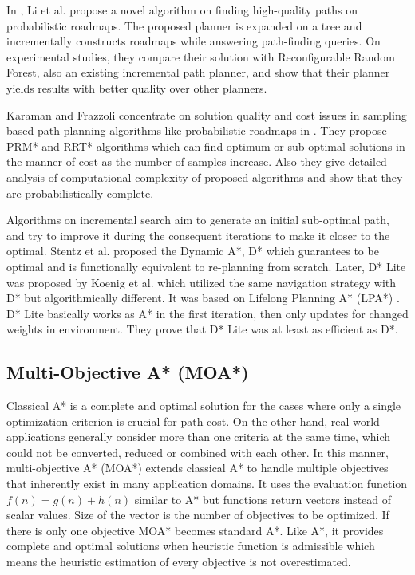 \documentclass[10pt,journal]{IEEEtran}
\begin{document}
In \cite{Li_KOrder:2014}, Li et al. propose a novel algorithm on finding high-quality paths on probabilistic roadmaps. The proposed planner is expanded on a tree and incrementally constructs roadmaps while answering path-finding queries. On experimental studies, they compare their solution with Reconfigurable Random Forest, also an existing incremental path planner, and show that their planner yields results with better quality over other planners.

Karaman and Frazzoli concentrate on solution quality and cost issues in sampling based path planning algorithms like probabilistic roadmaps in \cite{Karaman:2011}. They propose PRM* and RRT* algorithms which can find optimum or sub-optimal solutions in the manner of cost as the number of samples increase. Also they give detailed analysis of computational complexity of proposed algorithms and show that they are probabilistically complete.%

Algorithms on incremental search aim to generate an initial sub-optimal path, and try to improve it during the consequent iterations to make it closer to the optimal. Stentz et al. proposed the Dynamic A*, D* \cite{DStar:1994} which guarantees to be optimal and is functionally equivalent to re-planning from scratch. Later, D* Lite was proposed by Koenig et al. \cite{Koenig:2002} which utilized the same navigation strategy with D* but algorithmically different. It was based on Lifelong Planning A* (LPA*) \cite{LPAStarKoenig:2004}. D* Lite basically works as A* in the first iteration, then only updates for changed weights in environment. They prove that D* Lite was at least as efficient as D*.

\subsection{Multi-Objective A* (MOA*)}

Classical A* \cite{AStarHart:1968} is a complete and optimal solution for the cases where only a single optimization criterion is crucial for path cost. On the other hand, real-world applications generally consider more than one criteria at the same time, which could not be converted, reduced or combined with each other. In this manner, multi-objective A* (MOA*) \cite{MOAStewart:1991} extends classical A* to handle multiple objectives that inherently exist in many application domains. It uses the evaluation function $f(n) = g(n) + h(n)$ similar to A* but functions return vectors instead of scalar values. Size of the vector is the number of objectives to be optimized. If there is only one objective MOA* becomes standard A*. Like A*, it provides complete and optimal solutions when heuristic function is admissible which means the heuristic estimation of every objective is not overestimated.
\end{document}
